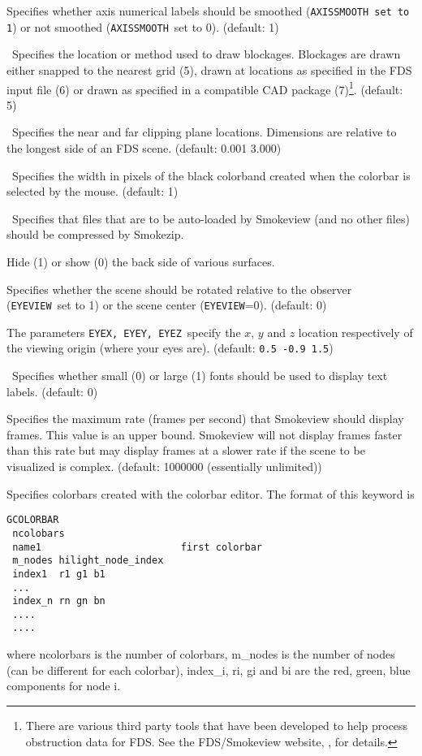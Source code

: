 \documentclass[11pt,twoside]{book}
\newcommand{\hitem}[1]{\item[{\bf #1} \hfill]}
\newcommand{\hitemNULL}[1]{}
\begin{document}
\hitem{AXISSMOOTH}Specifies
whether axis  numerical labels should be smoothed
({\tt AXISSMOOTH set to 1}) or not smoothed ({\tt AXISSMOOTH}\ set to 0).
(default: 1)

\hitem{BLOCKLOCATION}\ Specifies the location or method used to
draw blockages.  Blockages are drawn either snapped to the nearest
grid (5), drawn at locations as specified in the FDS input file
(6) or drawn as specified in a compatible CAD package (7)\footnote{There are various
third party tools that have been developed to help process obstruction data for FDS. See
the FDS/Smokeview website, , for details.}.   (default: 5)

\hitemNULL{BOUNDARYTWOSIDE}

\hitem{CLIP}\ Specifies the near and far clipping plane
locations.  Dimensions are relative to the longest side of
an FDS scene. (default: 0.001 3.000)

\hitemNULL{CONTOURTYPE}

\hitem{COLORBAND}\ Specifies the width in pixels of the black colorband created when the
colorbar is selected by the mouse.  (default: 1)

\hitem{COMPRESSAUTO}\ Specifies that files that are to be auto-loaded
by Smokeview (and no other files) should be compressed by Smokezip.

\hitem{CULLFACES}Hide (1) or show (0) the back side of various surfaces.

\hitem{EYEVIEW}Specifies whether
the scene should be rotated relative to the observer ({\tt EYEVIEW}\ set to 1)
or the scene center ({\tt EYEVIEW}=0).
(default: 0)

\hitem{EYEX, EYEY, EYEZ}The parameters {\tt EYEX, EYEY, EYEZ}\ specify the
$x$, $y$ and $z$ location respectively of the viewing origin (where your eyes are).
(default: {\tt 0.5 -0.9 1.5})

\hitem{FONTSIZE}\ Specifies whether small (0) or large (1)
fonts should be used to display text labels. (default: 0)

\hitem{FRAMERATEVALUE}Specifies the maximum rate (frames per
second) that Smokeview should display frames. This value is an
upper bound.  Smokeview will not display frames faster than this
rate but may display frames at a slower rate if the scene to be
visualized is complex. (default: 1000000 (essentially unlimited))

\hitem{GCOLORBAR}Specifies colorbars created with the colorbar editor.
The format of this keyword is
\begin{lstlisting}
GCOLORBAR
 ncolobars
 name1                        first colorbar
 m_nodes hilight_node_index
 index1  r1 g1 b1
 ...
 index_n rn gn bn
 ....
 ....

\end{lstlisting}
where ncolorbars is the number of colorbars, m\_nodes is the number of nodes
(can be different for each colorbar), index\_i, ri, gi and bi are the red, green, blue components for
node i.
\end{document}
